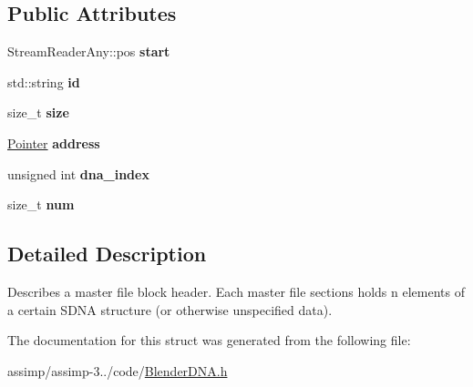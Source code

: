 \subsection*{Public Attributes}
\begin{DoxyCompactItemize}
\item 
\hypertarget{struct_assimp_1_1_blender_1_1_file_block_head_a3d09b468d61849a9f0a03fa158f7fc64}{Stream\+Reader\+Any\+::pos {\bfseries start}}\label{struct_assimp_1_1_blender_1_1_file_block_head_a3d09b468d61849a9f0a03fa158f7fc64}

\item 
\hypertarget{struct_assimp_1_1_blender_1_1_file_block_head_ac734624f848465f2ae2adcb64f9b8c25}{std\+::string {\bfseries id}}\label{struct_assimp_1_1_blender_1_1_file_block_head_ac734624f848465f2ae2adcb64f9b8c25}

\item 
\hypertarget{struct_assimp_1_1_blender_1_1_file_block_head_ab617cd49016416b4d232975bf947d77a}{size\+\_\+t {\bfseries size}}\label{struct_assimp_1_1_blender_1_1_file_block_head_ab617cd49016416b4d232975bf947d77a}

\item 
\hypertarget{struct_assimp_1_1_blender_1_1_file_block_head_a8ef5f3f768bcfa1f16ee611345c73c9a}{\hyperlink{struct_assimp_1_1_blender_1_1_pointer}{Pointer} {\bfseries address}}\label{struct_assimp_1_1_blender_1_1_file_block_head_a8ef5f3f768bcfa1f16ee611345c73c9a}

\item 
\hypertarget{struct_assimp_1_1_blender_1_1_file_block_head_a16f40fa0b359d5d65a5db63c3f4866e8}{unsigned int {\bfseries dna\+\_\+index}}\label{struct_assimp_1_1_blender_1_1_file_block_head_a16f40fa0b359d5d65a5db63c3f4866e8}

\item 
\hypertarget{struct_assimp_1_1_blender_1_1_file_block_head_a88fe364deb565f490c7bccbaf93601ff}{size\+\_\+t {\bfseries num}}\label{struct_assimp_1_1_blender_1_1_file_block_head_a88fe364deb565f490c7bccbaf93601ff}

\end{DoxyCompactItemize}


\subsection{Detailed Description}
Describes a master file block header. Each master file sections holds n elements of a certain S\+D\+N\+A structure (or otherwise unspecified data). 

The documentation for this struct was generated from the following file\+:\begin{DoxyCompactItemize}
\item 
assimp/assimp-\/3../code/\hyperlink{_blender_d_n_a_8h}{Blender\+D\+N\+A.\+h}\end{DoxyCompactItemize}
